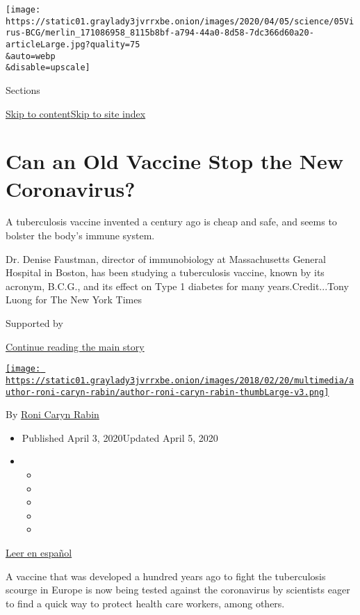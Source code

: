 \texttt{[image: https://static01.graylady3jvrrxbe.onion/images/2020/04/05/science/05Virus-BCG/merlin\_171086958\_8115b8bf-a794-44a0-8d58-7dc366d60a20-articleLarge.jpg?quality=75\\\&auto=webp\\\&disable=upscale]}

Sections

\protect\hyperlink{site-content}{Skip to
content}\protect\hyperlink{site-index}{Skip to site index}

\hypertarget{can-an-old-vaccine-stop-the-new-coronavirus}{%
\section{Can an Old Vaccine Stop the New
Coronavirus?}\label{can-an-old-vaccine-stop-the-new-coronavirus}}

A tuberculosis vaccine invented a century ago is cheap and safe, and
seems to bolster the body's immune system.

Dr. Denise Faustman, director of immunobiology at Massachusetts General
Hospital in Boston, has been studying a tuberculosis vaccine, known by
its acronym, B.C.G., and its effect on Type 1 diabetes for many
years.Credit...Tony Luong for The New York Times

Supported by

\protect\hyperlink{after-sponsor}{Continue reading the main story}

\href{https://www.nytimes3xbfgragh.onion/by/roni-caryn-rabin}{\texttt{[image: https://static01.graylady3jvrrxbe.onion/images/2018/02/20/multimedia/author-roni-caryn-rabin/author-roni-caryn-rabin-thumbLarge-v3.png]}}

By \href{https://www.nytimes3xbfgragh.onion/by/roni-caryn-rabin}{Roni
Caryn Rabin}

\begin{itemize}
\item
  Published April 3, 2020Updated April 5, 2020
\item
  \begin{itemize}
  \item
  \item
  \item
  \item
  \item
  \end{itemize}
\end{itemize}

\href{https://www.nytimes3xbfgragh.onion/es/2020/04/14/espanol/vacuna-coronavirus.html}{Leer
en español}

A vaccine that was developed a hundred years ago to fight the
tuberculosis scourge in Europe is now being tested against the
coronavirus by scientists eager to find a quick way to protect health
care workers, among others.

